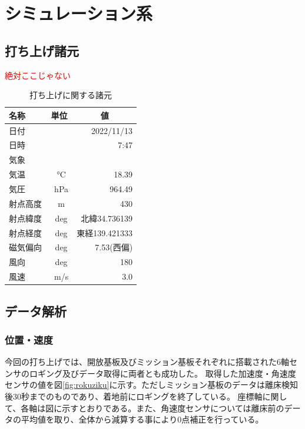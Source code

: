 \documentclass[a4paper,11pt,titlepage,uplatex]{jsarticle}
\begin{document}
\section{シミュレーション系}

\subsection{打ち上げ諸元}
\textcolor{red}{絶対ここじゃない}
\begin{table}[H]
    \centering
    \caption{打ち上げに関する諸元}
    \label{tab:utiage_shogen}
    \begin{tabular}{lcr}
        \hline
        名称   & 単位                    & \multicolumn{1}{c}{値} \\
        \hline
        日付   &                       & 2022/11/13            \\
        日時   &                       & 7:47                  \\
        気象   &                       &                       \\
        気温   & \SI{}{\degreeCelsius} & 18.39                 \\
        気圧   & \SI{}{hPa}            & 964.49                \\
        射点高度 & \SI{}{m}              & 430                   \\
        射点緯度 & \SI{}{deg}            & 北緯34.736139           \\
        射点経度 & \SI{}{deg}            & 東経139.421333          \\
        磁気偏向 & \SI{}{deg}            & 7.53(西偏)              \\
        風向   & \SI{}{deg}            & 180                   \\
        風速   & \SI{}{m/s}            & 3.0                   \\
        \hline
    \end{tabular}
\end{table}


\subsection{データ解析}

\subsubsection{位置・速度}
\label{itisokudo}
今回の打ち上げでは、開放基板及びミッション基板それぞれに搭載された6軸センサのロギング及びデータ取得に両者とも成功した。
取得した加速度・角速度センサの値を図\ref{fig:rokuziku}に示す。ただしミッション基板のデータは離床検知後30秒までのものであり、着地前にロギングを終了している。
座標軸に関して、各軸は図に示すとおりである。また、角速度センサについては離床前のデータの平均値を取り、全体から減算する事により0点補正を行っている。
\end{document}
